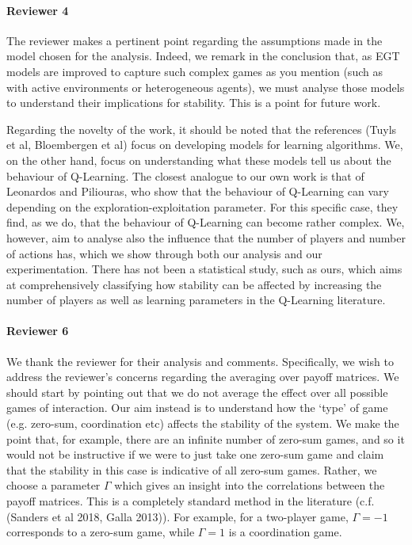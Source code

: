 \documentclass{article}
\begin{document}
\paragraph{Reviewer 4} %
\label{par:reviewer_4}

The reviewer makes a pertinent point regarding the assumptions made in the model chosen for the analysis.
Indeed, we remark in the conclusion that, as EGT models are improved to capture such complex games as you mention
(such as with active environments or heterogeneous agents), we must analyse those models to
understand their implications for stability. This is a point for future work.

Regarding the novelty of the work, it should be noted that the references (Tuyls et al,
Bloembergen et al) focus on developing models for learning algorithms. We, on the other hand, focus
on understanding what these models tell us about the behaviour of Q-Learning. The closest analogue
to our own work is that of Leonardos and Piliouras, who show that the behaviour of Q-Learning can
vary
depending on the exploration-exploitation parameter. For this specific case, they find, as we do,
that the behaviour of Q-Learning can become rather complex. We, however, aim to analyse also the
influence that the number of players and number of actions has, which we show through both our
analysis and our experimentation. There has not been a statistical study, such as ours, which aims at comprehensively classifying how stability can be affected by increasing the number of players as well as learning parameters in the Q-Learning literature.


\paragraph{Reviewer 6} %
\label{par:reviewer_6}

We thank the reviewer for their analysis and comments. Specifically, we wish to address the
reviewer's concerns regarding the averaging over payoff matrices. We should start by pointing out
that we do not average the effect over all possible games of interaction. Our aim instead is to
understand how the `type' of game (e.g. zero-sum, coordination etc) affects the stability of the
system. We make the point that, for example, there are an infinite number of zero-sum games, and so
it would not be instructive if we were to just take one zero-sum game and
claim that the stability in this case is indicative of all zero-sum games. Rather, we choose
a parameter $\Gamma$ which
gives an insight into the correlations between the payoff matrices. This is a completely standard method in the literature (c.f. (Sanders et al 2018, Galla 2013)). For example, for a two-player
game, $\Gamma = -1$ corresponds to a zero-sum game, while $\Gamma = 1$ is a coordination game.
\end{document}
